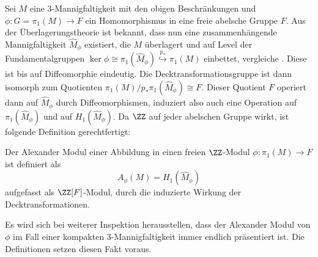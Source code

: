 
    	Sei $M$ eine 3-Mannigfaltigkeit mit den obigen Beschränkungen und $\phi: G=\pi_1(M) \to F$ ein Homomorphismus in eine freie abelsche Gruppe $F$. Aus der Überlagerungstheorie ist bekannt, dass nun eine zusammenhängende Mannigfaltigkeit $\hat M_\phi$ existiert, die $M$ überlagert und auf Level der Fundamentalgruppen $\ker \phi \cong \pi_1 (\hat M_\phi) \stackrel{p_*}{\hookrightarrow} \pi_1(M)$ einbettet, vergleiche \cite[Kapitel~1.3]{Hatcher.2002}. Diese ist bis auf Diffeomorphie eindeutig. Die Decktransformationsgruppe ist dann isomorph zum Quotienten $\pi_1(M)/p_*\pi_1(\hat M_\phi) \cong F$. Dieser Quotient $F$ operiert dann auf $\hat M_\phi$ durch Diffeomorphismen, induziert also auch eine Operation auf $\pi_1(\hat M_\phi)$ und auf $H_1(\hat M_\phi)$. Da $\ZZ$ auf jeder abelschen Gruppe wirkt, ist folgende Definition gerechtfertigt:
    	\begin{defn}
    		Der Alexander Modul einer Abbildung in einen freien $\ZZ$-Modul $\phi: \pi_1(M) \to F$ ist definiert als
    		\[
    			A_\phi(M) = H_1(\hat M_\phi)
    		\]
    		aufgefasst als $\ZZ[F]$-Modul, durch die induzierte Wirkung der Decktransformationen.
    	\end{defn}
    	Es wird sich bei weiterer Inspektion herausstellen, dass der Alexander Modul von $\phi$ im Fall einer kompakten 3-Mannigfaltigkeit immer endlich präsentiert ist. Die Definitionen setzen diesen Fakt voraus.

